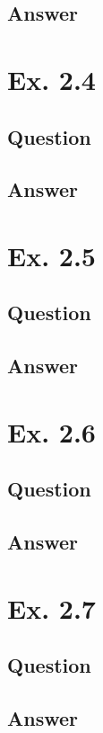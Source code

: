 \documentclass[12pt]{article}
\begin{document}
\subsection*{Answer}

\newpage
\section*{Ex. 2.4}
\subsection*{Question}

\subsection*{Answer}

\newpage
\section*{Ex. 2.5}
\subsection*{Question}

\subsection*{Answer}

\newpage
\section*{Ex. 2.6}
\subsection*{Question}

\subsection*{Answer}

\newpage
\section*{Ex. 2.7}
\subsection*{Question}

\subsection*{Answer}
\end{document}
